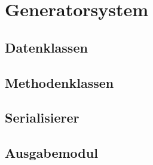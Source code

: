 \section{Generatorsystem}
\label{sec:generatorsystem}

\subsection{Datenklassen}
\label{sec:dataclasses}

\subsection{Methodenklassen}
\label{sec:methodclasses}

\subsection{Serialisierer}
\label{sec:serialiser}

\subsection{Ausgabemodul}
\label{sec:printer}
